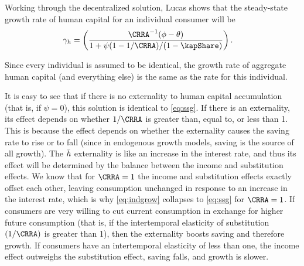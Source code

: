 \documentclass{handout}
\begin{document}
Working through the decentralized solution, Lucas shows that the
steady-state growth rate of human capital for an individual consumer 
will be
\begin{equation}\begin{gathered}\begin{aligned}
  \gamma_\hLucas &  =  \left(\frac{\CRRA^{-1}(\phi-\theta)}{1+\psi(1-1/\CRRA)/(1-\kapShare)}\right) \label{eq:indgrow}.
\end{aligned}\end{gathered}\end{equation}

Since every individual is assumed to be identical, the growth rate
of aggregate human capital (and everything else) is the same as
the rate for this individual.

It is easy to see that if there is no externality to human capital
accumulation (that is, if $\psi = 0$), this solution is identical to
\eqref{eq:ssg}.  If there is an externality, its effect depends on
whether $1/\CRRA$ is greater than, equal to, or less than 1.  This is
because the effect depends on whether the externality causes the
saving rate to rise or to fall (since in endogenous growth models,
saving is the source of all growth).  The $\bar{h}$ externality is like an
increase in the interest rate, and thus its effect will be determined
by the balance between the income and substitution effects.  We know
that for $\CRRA=1$ the income and substitution effects exactly offset
each other, leaving consumption unchanged in response to an
increase in the interest rate, which is why \eqref{eq:indgrow}
collapses to \eqref{eq:ssg} for $\CRRA=1$.  If consumers are very
willing to cut current consumption in exchange for higher future
consumption (that is, if the intertemporal elasticity of substitution
$(1/\CRRA)$ is greater than 1), then the externality boosts saving
and therefore growth.  If consumers have an intertemporal elasticity
of less than one, the income effect outweighs the substitution effect,
saving falls, and growth is slower.
\end{document}
